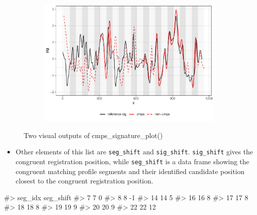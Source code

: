 \begin{figure}[hbt]
\begin{subfigure}[t]{\textwidth}
\begin{adjustbox}{valign=t}
\begin{minipage}{.39\textwidth}
{\small {}
\begin{Schunk}
\end{Schunk}
}
\vspace{1em}
\end{minipage}
\begin{minipage}{.59\textwidth}
\includegraphics[width=\textwidth]{ju-hofmann_files/figure-latex/sigplot2-1.pdf}
\end{minipage}
\end{adjustbox}
\end{subfigure}
\caption{\label{fig:sigplots} Two visual outputs of cmps\_signature\_plot()}
\end{figure}

\begin{itemize}
\tightlist
\item
  Other elements of this list are \texttt{seg\_shift} and
  \texttt{sig\_shift}. \texttt{sig\_shift} gives the congruent
  registration position, while \texttt{seg\_shift} is a data frame
  showing the congruent matching profile segments and their identified
  candidate position closest to the congruent registration position.
\end{itemize}

\begin{Schunk}
\begin{Soutput}
#>    seg_idx seg_shift
#> 7        7         0
#> 8        8        -1
#> 14      14         5
#> 16      16         8
#> 17      17         8
#> 18      18         8
#> 19      19         9
#> 20      20         9
#> 22      22        12
\end{Soutput}
\end{Schunk}


